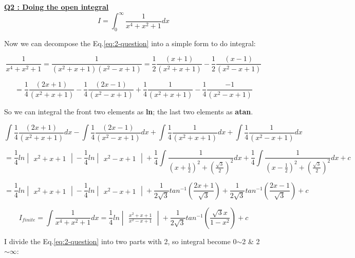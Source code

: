 \documentclass{article}
\begin{document}
\underline{\textbf{Q2 : Doing the open integral}}
\begin{equation}
    I=\int_0^\infty \frac{1}{x^4+x^2+1}dx
    \label{eq:2-question}
\end{equation}

Now we can decompose the Eq.\ref{eq:2-question} into a simple form to do integral:

\begin{equation}
\frac{1}{x^4+x^2+1}=
\frac{1}{(x^2+x+1)(x^2-x+1)}=
\frac{1}{2}\frac{(x+1)}{(x^2+x+1)}-\frac{1}{2}\frac{(x-1)}{(x^2-x+1)}
\label{eq:2-part}
\end{equation}

$$
=\frac{1}{4}\frac{(2x+1)}{(x^2+x+1)}-\frac{1}{4}\frac{(2x-1)}{(x^2-x+1)}
+\frac{1}{4}\frac{1}{(x^2+x+1)}-\frac{1}{4}\frac{-1}{(x^2-x+1)}
$$

So we can integral the front two elements as \textbf{ln}; the last two elements as \textbf{atan}.

$$
\int \frac{1}{4}\frac{(2x+1)}{(x^2+x+1)}dx-\int\frac{1}{4}\frac{(2x-1)}{(x^2-x+1)}dx
+\int \frac{1}{4}\frac{1}{(x^2+x+1)}dx+\int \frac{1}{4}\frac{1}{(x^2-x+1)}dx
$$

$$
=\frac{1}{4}ln\begin{vmatrix}x^2+x+1\end{vmatrix}
-\frac{1}{4}ln\begin{vmatrix}x^2-x+1\end{vmatrix}
+\frac{1}{4} \int \frac{1}{{(x+\frac{1}{2})}^2+(\frac{\sqrt{3}}{2})^2} dx
+\frac{1}{4} \int \frac{1}{{(x-\frac{1}{2})}^2+(\frac{\sqrt{3}}{2})^2} dx
+c
$$

$$
=\frac{1}{4}ln\begin{vmatrix}x^2+x+1\end{vmatrix}
-\frac{1}{4}ln\begin{vmatrix}x^2-x+1\end{vmatrix}
+\frac{1}{2\sqrt{3}}tan^{-1}(\frac{2x+1}{\sqrt{3}})
+\frac{1}{2\sqrt{3}}tan^{-1}(\frac{2x-1}{\sqrt{3}})
+c
$$

\begin{equation}
I_{finite}
=
\int \frac{1}{x^4+x^2+1}dx
=
\frac{1}{4}ln
\begin{vmatrix}
\frac{x^2+x+1}{x^2-x+1}
\end{vmatrix}
+
\frac{1}{2\sqrt{3}}tan^{-1}(\frac{\sqrt{3}x}{1-x^2})
+c
\label{eq:2-finity}
\end{equation}

I divide the Eq.\ref{eq:2-question} into two parts with 2, so integral become 0$\sim$2 \& 2$\sim \infty$:
\end{document}
